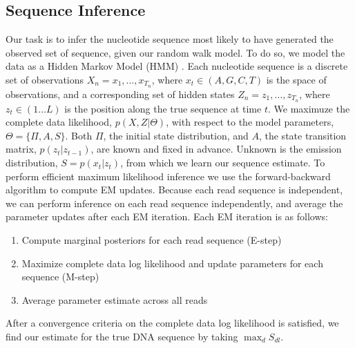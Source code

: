 \documentclass[12pt]{article}
\begin{document}
\subsection{Sequence Inference}

Our task is to infer the nucleotide sequence most likely to have generated the observed set of sequence, given our random walk model. To do so, we model the data as a Hidden Markov Model (HMM) \cite{Rabiner1989}. Each nucleotide sequence is a discrete set of observations $X_n = x_1,\ldots,x_{T_n}$, where $x_t \in (A,G,C,T)$ is the space of observations, and a corresponding set of hidden states $Z_n = z_1,\ldots,z_{T_n}$, where $z_t \in (1\ldots L)$ is the position along the true sequence at time $t$. We maximuze the complete data likelihood, $p(X,Z|\Theta)$, with respect to the model parameters, $\Theta=\{\Pi,A,S\}$. Both $\Pi$, the initial state distribution, and $A$, the state transition matrix, $p(z_t|z_{t-1})$, are known and fixed in advance. Unknown is the emission distribution, $S = p(x_t|z_t)$, from which we learn our sequence estimate. To perform efficient maximum likelihood inference we use the forward-backward algorithm to compute EM updates. Because each read sequence is independent, we can perform inference on each read sequence independently, and average the parameter updates after each EM iteration. Each EM iteration is as follows:

\begin{enumerate}
\item Compute marginal posteriors for each read sequence (E-step)
\item Maximize complete data log likelihood and update parameters for each sequence (M-step)
\item Average parameter estimate across all reads
\end{enumerate}

After a convergence criteria on the complete data log likelihood is satisfied, we find our estimate for the true DNA sequence by taking $\max_d S_{dl}$.

\end{document}
